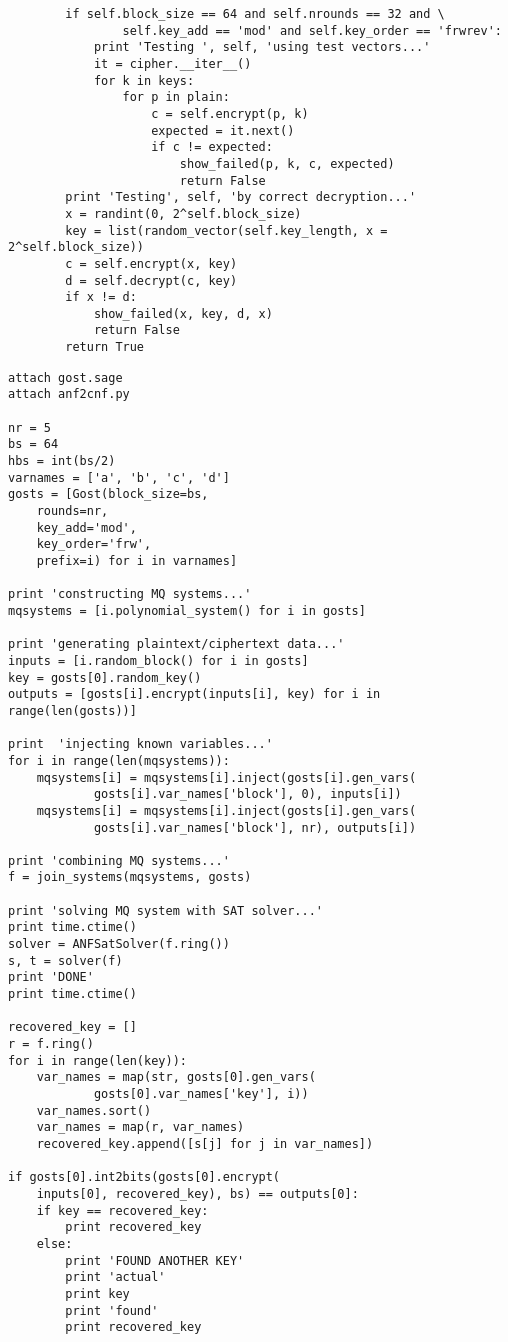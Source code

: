 \begin{lstlisting}
        if self.block_size == 64 and self.nrounds == 32 and \
                self.key_add == 'mod' and self.key_order == 'frwrev':
            print 'Testing ', self, 'using test vectors...'
            it = cipher.__iter__()
            for k in keys:
                for p in plain:
                    c = self.encrypt(p, k)
                    expected = it.next() 
                    if c != expected:
                        show_failed(p, k, c, expected)
                        return False
        print 'Testing', self, 'by correct decryption...'
        x = randint(0, 2^self.block_size)
        key = list(random_vector(self.key_length, x = 2^self.block_size))
        c = self.encrypt(x, key)
        d = self.decrypt(c, key)
        if x != d:
            show_failed(x, key, d, x)
            return False
        return True
\end{lstlisting}


\label{app:solving-sat}

\begin{lstlisting}
attach gost.sage
attach anf2cnf.py

nr = 5
bs = 64
hbs = int(bs/2)
varnames = ['a', 'b', 'c', 'd']
gosts = [Gost(block_size=bs, 
    rounds=nr, 
    key_add='mod', 
    key_order='frw', 
    prefix=i) for i in varnames]

print 'constructing MQ systems...'
mqsystems = [i.polynomial_system() for i in gosts]

print 'generating plaintext/ciphertext data...'
inputs = [i.random_block() for i in gosts]
key = gosts[0].random_key()
outputs = [gosts[i].encrypt(inputs[i], key) for i in range(len(gosts))]

print  'injecting known variables...'
for i in range(len(mqsystems)):
    mqsystems[i] = mqsystems[i].inject(gosts[i].gen_vars(
            gosts[i].var_names['block'], 0), inputs[i])
    mqsystems[i] = mqsystems[i].inject(gosts[i].gen_vars(
            gosts[i].var_names['block'], nr), outputs[i])

print 'combining MQ systems...'
f = join_systems(mqsystems, gosts)

print 'solving MQ system with SAT solver...'
print time.ctime()
solver = ANFSatSolver(f.ring())
s, t = solver(f)
print 'DONE'
print time.ctime()

recovered_key = []
r = f.ring()
for i in range(len(key)):
    var_names = map(str, gosts[0].gen_vars(
            gosts[0].var_names['key'], i))
    var_names.sort()
    var_names = map(r, var_names)
    recovered_key.append([s[j] for j in var_names])

if gosts[0].int2bits(gosts[0].encrypt(
    inputs[0], recovered_key), bs) == outputs[0]:
    if key == recovered_key:
        print recovered_key
    else:
        print 'FOUND ANOTHER KEY'
        print 'actual'
        print key
        print 'found'
        print recovered_key
\end{lstlisting}


